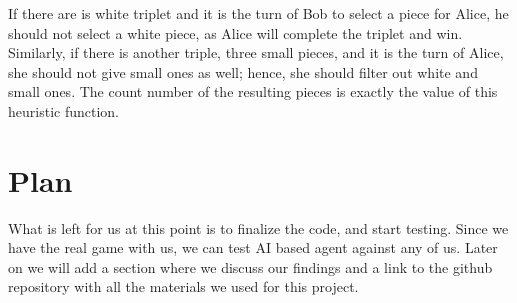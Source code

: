 \documentclass[paper=a4, fontsize=11pt]{article} %
\begin{document}
 If there are is white triplet and it is the turn of Bob to select a piece for Alice, he should not select a white piece, as Alice will complete the triplet and win. Similarly, if there is another triple, three small pieces, and it is the turn of Alice, she should not give small ones as well; hence, she should filter out white and small ones. The count number of the resulting pieces is exactly the value of this heuristic function.
 
\section{Plan} \label{txt:arch}
What is left for us at this point is to finalize the code, and start testing. Since we have the real game with us, we can test AI based agent against any of us. Later on we will add a section where we discuss our findings and a link to the github repository with all the materials we used for this project.

\printbibliography
\begin{flushleft}
%
\end{flushleft}
\end{document}
